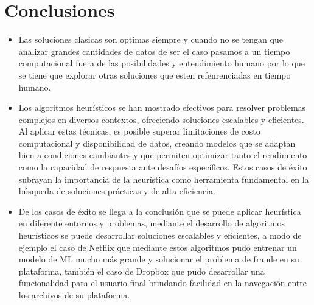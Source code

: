 \documentclass[9pt,a4paper,twoside]{rho-class/rho}
\begin{document}
    \section{Conclusiones}
        \begin{itemize}
            \item Las soluciones clasicas son optimas siempre y cuando no se tengan que analizar grandes cantidades de datos de ser el caso pasamos a un tiempo computacional fuera de las posibilidades y entendimiento humano por lo que se tiene que explorar otras soluciones que esten refenrenciadas en tiempo humano.
            \item Los algoritmos heurísticos se han mostrado efectivos para resolver problemas complejos en diversos contextos, ofreciendo soluciones escalables y eficientes. Al aplicar estas técnicas, es posible superar limitaciones de costo computacional y disponibilidad de datos, creando modelos que se adaptan bien a condiciones cambiantes y que permiten optimizar tanto el rendimiento como la capacidad de respuesta ante desafíos específicos. Estos casos de éxito subrayan la importancia de la heurística como herramienta fundamental en la búsqueda de soluciones prácticas y de alta eficiencia.
            \item De los casos de éxito se llega a la conclusión que se puede aplicar heurística en diferente entornos y problemas, mediante el desarrollo de algoritmos heurísticos se puede desarrollar soluciones escalables y eficientes, a modo de ejemplo el caso de Netflix que mediante estos algoritmos pudo entrenar un modelo de ML mucho más grande y solucionar el problema de fraude en su plataforma, también el caso de Dropbox que pudo desarrollar una funcionalidad para el usuario final brindando facilidad en la navegación entre los archivos de su plataforma.
        \end{itemize}
    \renewcommand{\contentsname}{Tabla de Contenidos}
    \tableofcontents
    \linenumbers

\printbibliography

\end{document}
